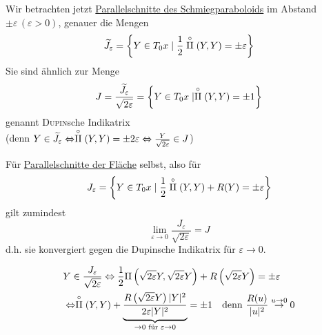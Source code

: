 Wir betrachten jetzt \uline{Parallelschnitte des Schmiegparaboloids} im Abstand \(\pm \varepsilon \, (\varepsilon > 0)\), genauer die Mengen
\begin{align*}
 \widetilde J_\varepsilon = \left\{ Y \in T_0 x \mid \frac12 \stackrel \circ {\Rom2} (Y,Y) = \pm \varepsilon\right\}
\end{align*}
 Sie sind ähnlich zur Menge
 \[
  J = \frac{\widetilde J_\varepsilon}{\sqrt{2\varepsilon}} = \left\{ Y \in T_0 x \mid \stackrel \circ {\Rom2} (Y,Y) = \pm 1\right\}
 \]
 genannt \textsc{Dupin}sche Indikatrix \\
 (denn \(Y \in \widetilde J_\varepsilon \Leftrightarrow \stackrel \circ {\Rom2}(Y,Y) = \pm 2\varepsilon \Leftrightarrow \frac{Y}{\sqrt{2\varepsilon}} \in J\)) \par
 Für \uline{Parallelschnitte der Fläche} selbst, also für
 \[
  J_\varepsilon = \left\{ Y \in T_0 x\mid \frac12 \stackrel{\circ}{\Rom2}(Y,Y) + R(Y) = \pm \varepsilon \right\}
 \]
 gilt zumindest
 \[
  \lim_{\varepsilon \to 0} \frac{J_\varepsilon}{\sqrt{2\varepsilon}} = J
 \]
 d.h. sie konvergiert gegen die Dupinsche Indikatrix für \(\varepsilon \to 0\).
 
\begin{beweis}
 \begin{align*}
  &Y \in \frac{J_\varepsilon}{\sqrt{2\varepsilon}} \Leftrightarrow \frac12 \Rom2 \left( \sqrt{2\varepsilon}Y, \sqrt{2\varepsilon}Y\right) + R\left(\sqrt{2\varepsilon} Y\right) = \pm \varepsilon \\
  &\Leftrightarrow \stackrel{\circ}{\Rom2}(Y,Y) + \underbrace{\frac{R\left(\sqrt{2\varepsilon}Y\right)|Y|^2}{2\varepsilon |Y|^2}}_{\to 0 \text{ für } \varepsilon \to 0} = \pm 1 \quad \text{denn } \frac{R(u)}{|u|^2} \stackrel {u \to 0}\to 0
 \end{align*}

\end{beweis}

